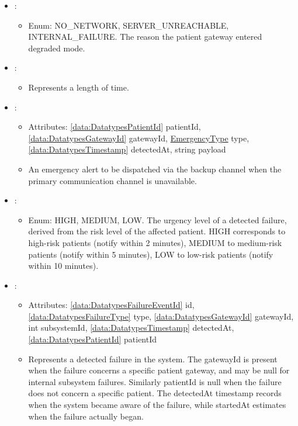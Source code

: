 \begin{itemize}[nolistsep,noitemsep]
\item {}: 
\begin{itemize}[noitemsep,nolistsep]

\item[] Enum: NO\_NETWORK, SERVER\_UNREACHABLE, INTERNAL\_FAILURE.
The reason the patient gateway entered degraded mode.
\end{itemize}

\item {}: 
\begin{itemize}[noitemsep,nolistsep]

\item[] Represents a length of time.
\end{itemize}

\item {}: 
\begin{itemize}[noitemsep,nolistsep]
\item[] Attributes: \ref{data:DatatypesPatientId} patientId, \ref{data:DatatypesGatewayId} gatewayId, {\colorbox{red!30}{\underline{EmergencyType}}} type, \ref{data:DatatypesTimestamp} detectedAt, string payload
\item[] An emergency alert to be dispatched via the backup channel 
  when the primary communication channel is unavailable.
\end{itemize}

\item {}: 
\begin{itemize}[noitemsep,nolistsep]

\item[] Enum: HIGH, MEDIUM, LOW.
The urgency level of a detected failure, derived from the risk level of the affected patient. HIGH corresponds to high-risk patients (notify within 2 minutes), MEDIUM to medium-risk patients (notify within 5 minutes), LOW to low-risk patients (notify within 10 minutes).
\end{itemize}

\item {}: 
\begin{itemize}[noitemsep,nolistsep]
\item[] Attributes: \ref{data:DatatypesFailureEventId} id, \ref{data:DatatypesFailureType} type, \ref{data:DatatypesGatewayId} gatewayId, int subsystemId, \ref{data:DatatypesTimestamp} detectedAt, \ref{data:DatatypesPatientId} patientId
\item[] Represents a detected failure in the system. The gatewayId 
  is present when the failure concerns a specific patient gateway, 
  and may be null for internal subsystem failures. Similarly 
  patientId is null when the failure does not concern a specific 
  patient. The detectedAt timestamp records when the system became 
  aware of the failure, while startedAt estimates when the failure 
  actually began.
\end{itemize}


\end{itemize}

